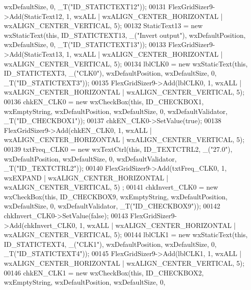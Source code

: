 \begin{DoxyCode}
      wxDefaultSize, 0, _T(\textcolor{stringliteral}{"ID\_STATICTEXT12"}));
00131     FlexGridSizer9->Add(StaticText12, 1, wxALL | wxALIGN\_CENTER\_HORIZONTAL | wxALIGN\_CENTER\_VERTICAL, 5);
00132     StaticText13 = \textcolor{keyword}{new} wxStaticText(\textcolor{keyword}{this}, ID\_STATICTEXT13, \_(\textcolor{stringliteral}{"Invert output"}), wxDefaultPosition, 
      wxDefaultSize, 0, _T(\textcolor{stringliteral}{"ID\_STATICTEXT13"}));
00133     FlexGridSizer9->Add(StaticText13, 1, wxALL | wxALIGN\_CENTER\_HORIZONTAL | wxALIGN\_CENTER\_VERTICAL, 5);
00134     lblCLK0 = \textcolor{keyword}{new} wxStaticText(\textcolor{keyword}{this}, ID\_STATICTEXT3, \_(\textcolor{stringliteral}{"CLK0"}), wxDefaultPosition, wxDefaultSize, 0, 
      _T(\textcolor{stringliteral}{"ID\_STATICTEXT3"}));
00135     FlexGridSizer9->Add(lblCLK0, 1, wxALL | wxALIGN\_CENTER\_HORIZONTAL | wxALIGN\_CENTER\_VERTICAL, 5);
00136     chkEN\_CLK0 = \textcolor{keyword}{new} wxCheckBox(\textcolor{keyword}{this}, ID\_CHECKBOX1, wxEmptyString, wxDefaultPosition, wxDefaultSize, 0, 
      wxDefaultValidator, _T(\textcolor{stringliteral}{"ID\_CHECKBOX1"}));
00137     chkEN\_CLK0->SetValue(\textcolor{keyword}{true});
00138     FlexGridSizer9->Add(chkEN\_CLK0, 1, wxALL | wxALIGN\_CENTER\_HORIZONTAL | wxALIGN\_CENTER\_VERTICAL, 5);
00139     txtFreq\_CLK0 = \textcolor{keyword}{new} wxTextCtrl(\textcolor{keyword}{this}, ID\_TEXTCTRL2, \_(\textcolor{stringliteral}{"27.0"}), wxDefaultPosition, wxDefaultSize, 0, 
      wxDefaultValidator, _T(\textcolor{stringliteral}{"ID\_TEXTCTRL2"}));
00140     FlexGridSizer9->Add(txtFreq\_CLK0, 1, wxEXPAND | wxALIGN\_CENTER\_HORIZONTAL | wxALIGN\_CENTER\_VERTICAL, 5)
      ;
00141     chkInvert\_CLK0 = \textcolor{keyword}{new} wxCheckBox(\textcolor{keyword}{this}, ID\_CHECKBOX9, wxEmptyString, wxDefaultPosition, wxDefaultSize, 0,
       wxDefaultValidator, _T(\textcolor{stringliteral}{"ID\_CHECKBOX9"}));
00142     chkInvert\_CLK0->SetValue(\textcolor{keyword}{false});
00143     FlexGridSizer9->Add(chkInvert\_CLK0, 1, wxALL | wxALIGN\_CENTER\_HORIZONTAL | wxALIGN\_CENTER\_VERTICAL, 5);
00144     lblCLK1 = \textcolor{keyword}{new} wxStaticText(\textcolor{keyword}{this}, ID\_STATICTEXT4, \_(\textcolor{stringliteral}{"CLK1"}), wxDefaultPosition, wxDefaultSize, 0, 
      _T(\textcolor{stringliteral}{"ID\_STATICTEXT4"}));
00145     FlexGridSizer9->Add(lblCLK1, 1, wxALL | wxALIGN\_CENTER\_HORIZONTAL | wxALIGN\_CENTER\_VERTICAL, 5);
00146     chkEN\_CLK1 = \textcolor{keyword}{new} wxCheckBox(\textcolor{keyword}{this}, ID\_CHECKBOX2, wxEmptyString, wxDefaultPosition, wxDefaultSize, 0, 

\end{DoxyCode}

